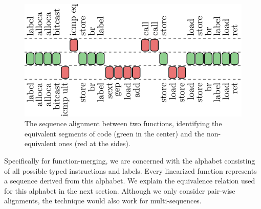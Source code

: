 \begin{figure}[t]
  \centering
  \includegraphics[width=0.75\linewidth]{figs/opcode-align.pdf}
  \caption{The sequence alignment between two functions, identifying the equivalent segments of code (green in the center) and the non-equivalent ones (red at the sides).}
  \label{fig:opcode-align}
\end{figure}

Specifically for function-merging, we are concerned with the alphabet
consisting of all possible typed instructions and labels.
Every linearized function represents a sequence derived from this alphabet.
We explain the equivalence relation used for this alphabet in the next section.
Although we only consider pair-wise alignments, the technique would also work
for multi-sequences.



